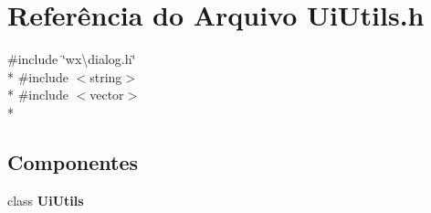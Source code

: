 \section{Referência do Arquivo Ui\+Utils.\+h}
\label{_ui_utils_8h}
{\ttfamily \#include \char`\"{}wx\textbackslash{}dialog.\+h\char`\"{}}\\*
{\ttfamily \#include $<$string$>$}\\*
{\ttfamily \#include $<$vector$>$}\\*
\subsection*{Componentes}
\begin{DoxyCompactItemize}
\item 
class {\bf Ui\+Utils}
\end{DoxyCompactItemize}
